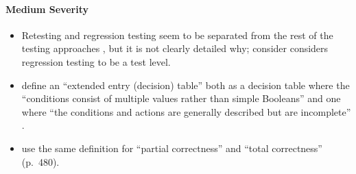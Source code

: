 \paragraph{Medium Severity}
\begin{itemize}\fi
      \item %
            Retesting and regression testing seem to be separated from the rest
            of the testing approaches \citep[p.~23]{IEEE2022}, but it is not
            clearly detailed why; \citet[p.~3]{BarbosaEtAl2006} \ifnotpaper
                  consider \else considers \fi regression testing to be a test level.
            \ifnotpaper
      \item %
            \citeauthor{IEEE2021} define an ``extended entry (decision) table''
            both as a decision table where the ``conditions consist of multiple
            values rather than simple Booleans'' \citeyearpar[p.~18]{IEEE2021}
            and one where ``the conditions and actions are generally described
            but are incomplete'' \citeyearpar[p.~175]{IEEE2017}.
      \item %
            \citeauthor{IEEE2017} use the same definition for ``partial correctness''
            \citeyearpar[p.~314]{IEEE2017} and ``total correctness'' (p.~480).
            \fi
\end{itemize}

\ifnotpaper
